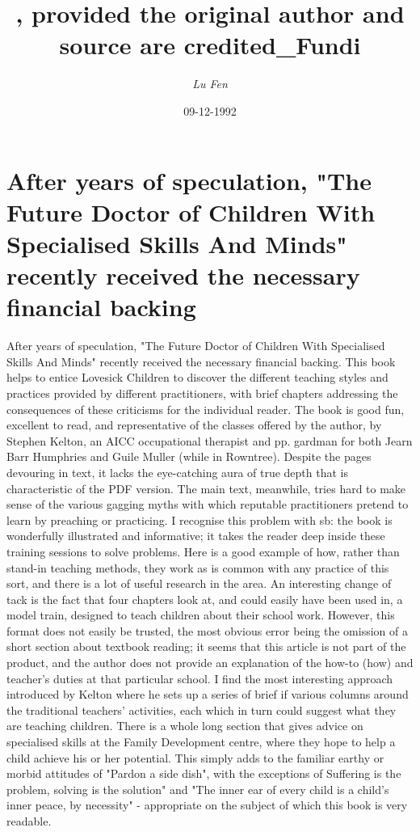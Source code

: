 \documentclass{article}%
\title{, provided the original author and source are credited\_Fundi}%
\author{\textit{Lu Fen}}%
\date{09-12-1992}%
\begin{document}
%
\normalsize%
\maketitle%
\section{After years of speculation, "The Future Doctor of Children With Specialised Skills And Minds" recently received the necessary financial backing}%
\label{sec:Afteryearsofspeculation,TheFutureDoctorofChildrenWithSpecialisedSkillsAndMindsrecentlyreceivedthenecessaryfinancialbacking}%
After years of speculation, "The Future Doctor of Children With Specialised Skills And Minds" recently received the necessary financial backing. This book helps to entice Lovesick Children to discover the different teaching styles and practices provided by different practitioners, with brief chapters addressing the consequences of these criticisms for the individual reader.\newline%
The book is good fun, excellent to read, and representative of the classes offered by the author, by Stephen Kelton, an AICC occupational therapist and pp. gardman for both Jearn Barr Humphries and Guile Muller (while in Rowntree). Despite the pages devouring in text, it lacks the eye{-}catching aura of true depth that is characteristic of the PDF version. The main text, meanwhile, tries hard to make sense of the various gagging myths with which reputable practitioners pretend to learn by preaching or practicing. I recognise this problem with sb: the book is wonderfully illustrated and informative; it takes the reader deep inside these training sessions to solve problems. Here is a good example of how, rather than stand{-}in teaching methods, they work as is common with any practice of this sort, and there is a lot of useful research in the area.\newline%
An interesting change of tack is the fact that four chapters look at, and could easily have been used in, a model train, designed to teach children about their school work. However, this format does not easily be trusted, the most obvious error being the omission of a short section about textbook reading; it seems that this article is not part of the product, and the author does not provide an explanation of the how{-}to (how) and teacher's duties at that particular school.\newline%
I find the most interesting approach introduced by Kelton where he sets up a series of brief if various columns around the traditional teachers' activities, each which in turn could suggest what they are teaching children. There is a whole long section that gives advice on specialised skills at the Family Development centre, where they hope to help a child achieve his or her potential. This simply adds to the familiar earthy or morbid attitudes of "Pardon a side dish", with the exceptions of Suffering is the problem, solving is the solution" and "The inner ear of every child is a child's inner peace, by necessity" {-} appropriate on the subject of which this book is very readable.\newline%
\end{document}
